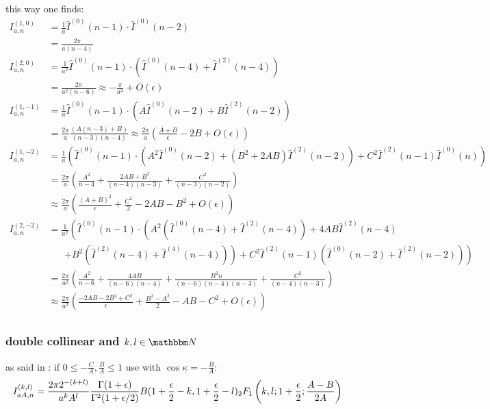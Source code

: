 this way one finds\cite[Ch. 5]{Bojak:2000eu}\cite[App. C]{PhysRevD.40.54}:
\begin{align}
I^{(1,0)}_{a,n} &= \frac 1 a\hat I^{(0)}(n-1) \cdot \hat I^{(0)}(n-2)\\
 &= \frac {2\pi}{a(n-4)}\\
I^{(2,0)}_{a,n} &= \frac 1 {a^2}\hat I^{(0)}(n-1) \cdot \left(\hat I^{(0)}(n-4) + \hat I^{(2)}(n-4)\right)\\
 &= \frac {2\pi}{a^2(n-6)} \approx -\frac {\pi}{a^2} + O(\epsilon)\\
I^{(1,-1)}_{a,n} &= \frac 1 a\hat I^{(0)}(n-1)\cdot \left(A\hat I^{(0)}(n-2)+B\hat I^{(2)}(n-2)\right)\\
 &= \frac {2\pi}{a}\frac{(A(n-3)+B)}{(n-3)(n-4)} \approx \frac {2\pi}{a}\left(\frac{A+B}\epsilon - 2B + O(\epsilon)\right)\\
I^{(1,-2)}_{a,n} &= \frac 1 a\left(\hat I^{(0)}(n-1)\cdot \left(A^2\hat I^{(0)}(n-2)+(B^2+2AB)\hat I^{(2)}(n-2)\right) + C^2\hat I^{(2)}(n-1)\hat I^{(0)}(n)\right)\\
 &= \frac {2\pi}{a}\left(\frac {A^2}{n-4} + \frac {2AB + B^2}{(n-4)(n-3)} + \frac {C^2}{(n-3)(n-2)}\right) \\
 &\approx \frac {2\pi}{a}\left(\frac{(A+B)^2}{\epsilon}+\frac{C^2}{2}-2AB-B^2+O(\epsilon)\right)\\
I^{(2,-2)}_{a,n} &= \frac 1 {a^2}\left(\hat I^{(0)}(n-1)\cdot \left(A^2(\hat I^{(0)}(n-4)+\hat I^{(2)}(n-4))+4AB\hat I^{(2)}(n-4) \right.\right.\nonumber\\
 &\hspace{20pt}\left.\left. + B^2(\hat I^{(2)}(n-4)+\hat I^{(4)}(n-4))\right) + C^2\hat I^{(2)}(n-1)(\hat I^{(0)}(n-2) + \hat I^{(2)}(n-2))\right)\\
 &= \frac {2\pi}{a^2}\left(\frac {A^2}{n-6}+\frac{4AB}{(n-6)(n-4)} + \frac{B^2 n}{(n-6)(n-4)(n-3)} + \frac{C^2}{(n-4)(n-3)} \right) \\
 &\approx \frac {2\pi}{a^2}\left(\frac{-2AB-2B^2+C^2}{\epsilon}+\frac{B^2-A^2}{2}-AB-C^2+O(\epsilon)\right)\\
\end{align}

\subsubsection{double collinear and $k,l\in\mathbbm N$}
as said in \cite[Ch. 5]{Bojak:2000eu}: if $0\leq -\frac{C}{A},\frac B A \leq 1$ use \cite[eq. A11]{van_neerven_dimensional_1986} with $\cos\kappa = -\frac B A$:
\begin{equation}
I_{aA,n}^{(k,l)} = \frac{2\pi 2^{-(k+l)}}{a^kA^l}\frac{\Gamma(1+\epsilon)}{\Gamma^2(1+\epsilon/2)} B(1+\frac \epsilon 2 - k, 1+ \frac \epsilon 2 -l) {}_{2}F_{1} \left(k,l;1+\frac \epsilon 2; \frac{A-B}{2A}\right)
\end{equation}

